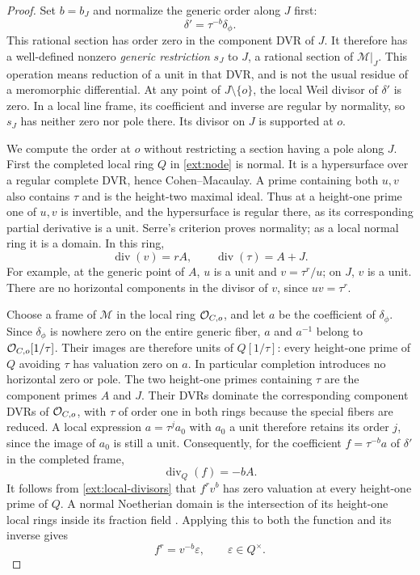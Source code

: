 \begin{proof}
Set $b=b_J$ and normalize the generic order along $J$ first:
\[
\delta'=\tau^{-b}\delta_\phi.
\]
This rational section has order zero in the component DVR of $J$.
It therefore has a well-defined nonzero \emph{generic restriction}
$s_J$ to $J$, a rational section of $\mathcal M|_J$. This operation
means reduction of a unit in that DVR, and is not the usual residue
of a meromorphic differential. At any point of $J\setminus\{o\}$,
the local Weil divisor of $\delta'$ is zero. In a local line frame,
its coefficient and inverse are regular by normality, so $s_J$ has
neither zero nor pole there. Its divisor on $J$ is supported at $o$.

We compute the order at $o$ without restricting a section having a
pole along $J$. First the completed local ring $Q$ in
\eqref{ext:node} is normal. It is a hypersurface over a regular
complete DVR, hence Cohen--Macaulay. A prime containing both $u,v$
also contains $\tau$ and is the height-two maximal ideal. Thus at a
height-one prime one of $u,v$ is invertible, and the hypersurface is
regular there, as its corresponding partial derivative is a unit.
Serre's criterion proves normality; as a local normal ring it is a
domain. In this ring,
\begin{equation}\label{ext:local-divisors}
\operatorname{div}(v)=rA,\qquad
\operatorname{div}(\tau)=A+J.
\end{equation}
For example, at the generic point of $A$, $u$ is a unit and
$v=\tau^r/u$; on $J$, $v$ is a unit. There are no horizontal
components in the divisor of $v$, since $uv=\tau^r$.

Choose a frame of $\mathcal M$ in the local ring
$\mathcal O_{C,o}$, and let $a$ be the coefficient of $\delta_\phi$.
Since $\delta_\phi$ is nowhere zero on the entire generic fiber,
$a$ and $a^{-1}$ belong to $\mathcal O_{C,o}[1/\tau]$. Their images are
therefore units of $Q[1/\tau]$: every height-one prime of $Q$
avoiding $\tau$ has valuation zero on $a$. In particular completion
introduces no horizontal zero or pole. The two height-one primes containing $\tau$
are the component primes $A$ and $J$. Their DVRs dominate the
corresponding component DVRs of $\mathcal O_{C,o}$, with $\tau$ of order
one in both rings because the special fibers are reduced. A local
expression $a=\tau^j a_0$ with $a_0$ a unit therefore retains its
order $j$, since the image of $a_0$ is still a unit.
Consequently, for the coefficient $f=\tau^{-b}a$ of $\delta'$ in
the completed frame,
\[
\operatorname{div}_Q(f)=-bA.
\]
It follows from \eqref{ext:local-divisors} that $f^rv^b$ has zero
valuation at every height-one prime of $Q$. A normal Noetherian
domain is the intersection of its height-one local rings inside
its fraction field \cite[Tag ]{Stacks}. Applying this to both
the function and its inverse gives
\begin{equation}\label{ext:unit-equation}
f^r=v^{-b}\varepsilon,\qquad \varepsilon\in Q^\times.
\end{equation}


\end{proof}
